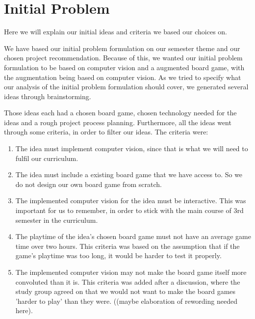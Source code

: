\chapter{Initial Problem}\label{ch:iniprob}
Here we will explain our initial ideas and criteria we based our choices on.

We have based our initial problem formulation on our semester theme and our chosen project recommendation. Because of this, we wanted our initial problem formulation to be based on computer vision and a augmented board game, with the augmentation being based on computer vision. As we tried to specify what our analysis of the initial problem formulation should cover, we generated several ideas through brainstorming.

Those ideas each had a chosen board game, chosen technology needed for the ideas and a rough project process planning. Furthermore, all the ideas went through some criteria, in order to filter our ideas.
The criteria were:
\begin{enumerate}
	\item The idea must implement computer vision, since that is what we will need to fulfil our curriculum.
	\item The idea must include a existing board game that we have access to. So we do not design our own board game from scratch.
	\item The implemented computer vision for the idea must be interactive. This was important for us to remember, in order to stick with the main course of 3rd semester in the curriculum.
	\item The playtime of the idea's chosen board game must not have an average game time over two hours. This criteria was based on the assumption that if the game's playtime was too long, it would be harder to test it properly.
	\item The implemented computer vision may not make the board game itself more convoluted than it is. This criteria was added after a discussion, where the study group agreed on that we would not want to make the board games 'harder to play' than they were. ((maybe elaboration of rewording needed here).
\end{enumerate}

